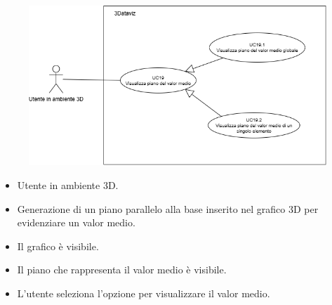\begin{figure}[h!]\centering
    \includegraphics[scale=0.7]{template/images/UC19.png}
    \caption{}
\end{figure}
\UCdsc
{ %
    \begin{itemize}
        \item Utente in ambiente 3D.
    \end{itemize}
}
{ %
    \begin{itemize}
        \item Generazione di un piano parallelo alla base inserito nel grafico 3D per evidenziare un valor medio.
    \end{itemize}
}
{ %
    \begin{itemize}
        \item Il grafico è visibile.
    \end{itemize}
}
{ %
    \begin{itemize}
        \item Il piano che rappresenta il valor medio è visibile.
    \end{itemize}
}
{ %
    \begin{itemize}
        \item L'utente seleziona l'opzione per visualizzare il valor medio.
    \end{itemize}
}


